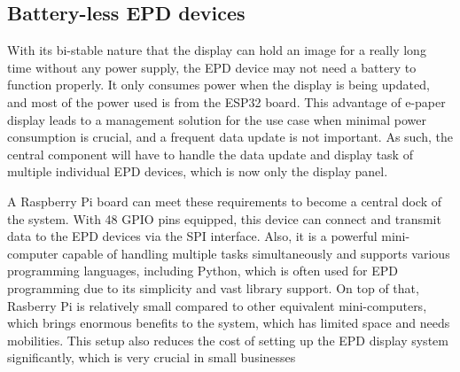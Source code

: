 \documentclass[../Main.tex]{subfiles}
\begin{document}
\begin{center}
    {\fontsize{7pt}{8pt}\selectfont 
    }
\end{center}

\subsection{Battery-less EPD devices}
With its bi-stable nature that the display can hold an image for a really long time without any power supply, the EPD device may not need a battery to function properly. It only consumes power when the display is being updated, and most of the power used is from the ESP32 board. This advantage of e-paper display leads to a management solution for the use case when minimal power consumption is crucial, and a frequent data update is not important. As such, the central component will have to handle the data update and display task of multiple individual EPD devices, which is now only the display panel.

A Raspberry Pi board can meet these requirements to become a central dock of the system. With 48 GPIO pins equipped, this device can connect and transmit data to the EPD devices via the SPI interface. Also, it is a powerful mini-computer capable of handling multiple tasks simultaneously and supports various programming languages, including Python, which is often used for EPD programming due to its simplicity and vast library support. On top of that, Rasberry Pi is relatively small compared to other equivalent mini-computers, which brings enormous benefits to the system, which has limited space and needs mobilities. This setup also reduces the cost of setting up the EPD display system significantly, which is very crucial in small businesses
\end{document}
